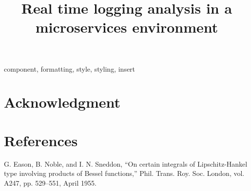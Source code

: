 \documentclass[conference]{IEEEtran}
\begin{document}
\title{Real time logging analysis in a microservices environment\\
}

\author{
}

\maketitle


\begin{IEEEkeywords}
component, formatting, style, styling, insert
\end{IEEEkeywords}



\section*{Acknowledgment}

\section*{References}

\begin{thebibliography}{00}
 G. Eason, B. Noble, and I. N. Sneddon, ``On certain integrals of Lipschitz-Hankel type involving products of Bessel functions,'' Phil. Trans. Roy. Soc. London, vol. A247, pp. 529--551, April 1955.
\end{thebibliography}
\vspace{12pt}
\end{document}
